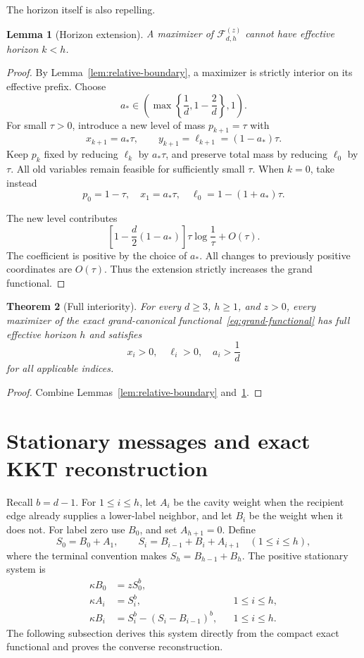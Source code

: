 \documentclass[11pt]{amsart}
\newtheorem{theorem}{Theorem}[section]
\newtheorem{lemma}[theorem]{Lemma}
\theoremstyle{definition}
\newcommand{\Fcal}{\mathcal F}
\begin{document}
The horizon itself is also repelling.

\begin{lemma}[Horizon extension]\label{lem:horizon-extension}
A maximizer of $\Fcal_{d,h}^{(z)}$ cannot have effective horizon $k<h$.
\end{lemma}

\begin{proof}
By Lemma~\ref{lem:relative-boundary}, a maximizer is strictly interior on its effective prefix.  Choose
\[
 a_*\in\left(\max\left\{\frac1d,1-\frac2d\right\},1\right).
\]
For small $\tau>0$, introduce a new level of mass $p_{k+1}=\tau$ with
\[
 x_{k+1}=a_*\tau,
 \qquad
 y_{k+1}=\ell_{k+1}=(1-a_*)\tau.
\]
Keep $p_k$ fixed by reducing $\ell_k$ by $a_*\tau$, and preserve total mass by reducing $\ell_0$ by $\tau$.  All old variables remain feasible for sufficiently small $\tau$.  When $k=0$, take instead
\[
 p_0=1-\tau,
 \quad
 x_1=a_*\tau,
 \quad
 \ell_0=1-(1+a_*)\tau.
\]

The new level contributes
\[
 \left[1-\frac d2(1-a_*)\right]
 \tau\log\frac1\tau+O(\tau).
\]
The coefficient is positive by the choice of $a_*$.  All changes to previously positive coordinates are $O(\tau)$.  Thus the extension strictly increases the grand functional.
\end{proof}

\begin{theorem}[Full interiority]\label{thm:full-interiority}
For every $d\ge3$, $h\ge1$, and $z>0$, every maximizer of the exact grand-canonical functional~\eqref{eq:grand-functional} has full effective horizon $h$ and satisfies
\[
 x_i>0,
 \quad
 \ell_i>0,
 \quad
 a_i>\frac1d
\]
for all applicable indices.
\end{theorem}

\begin{proof}
Combine Lemmas~\ref{lem:relative-boundary} and~\ref{lem:horizon-extension}.
\end{proof}



\section{Stationary messages and exact KKT reconstruction}\label{sec:stationarity}
Recall $b=d-1$.  For $1\le i\le h$, let $A_i$ be the cavity weight when the recipient edge already supplies a lower-label neighbor, and let $B_i$ be the weight when it does not.  For label zero use $B_0$, and set $A_{h+1}=0$.  Define
\[
 S_0=B_0+A_1,
 \qquad
 S_i=B_{i-1}+B_i+A_{i+1}\quad(1\le i\le h),
\]
where the terminal convention makes $S_h=B_{h-1}+B_h$.  The positive stationary system is
\begin{align}
 \kappa B_0&=zS_0^b,\label{eq:msg-root}\\
 \kappa A_i&=S_i^b,&&1\le i\le h,\label{eq:msg-A}\\
 \kappa B_i&=S_i^b-(S_i-B_{i-1})^b,&&1\le i\le h.\label{eq:msg-B}
\end{align}
The following subsection derives this system directly from the compact exact functional and proves the converse reconstruction.
\end{document}
